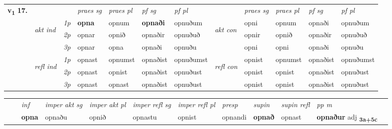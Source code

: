 \begin{tabular}{llllllllllll} \toprule
\multirow{4}{*}{{{\textbf{v{\textsubscript{1}}} \Large{\textbf{17.}}}}}  & &   &  \textit{praes sg}  & \textit{praes pl}  &\textit{ pf sg} & \textit{pf pl} &  &  \textit{praes sg}  & \textit{praes pl}  & \textit{pf sg} & \textit{pf pl } \\*
	\cmidrule{4-7} \cmidrule{9-12}
 & \multirow{3}{*}{\begin{turn}{90}\textit{akt ind}\end{turn}} & {\textit{1p}} & \textbf{opna} & opnum    & \textbf{opnaði} & opnuðum & \multirow{3}{*}{\begin{turn}{90}\textit{akt con}\end{turn}} &opni & opnum & opnaði & opnuðum\\*
& &  {\textit{2p}} &  opnar  & opnið   & opnaðir & opnuðuð & & opnir & opnið & opnaðir & opnuðuð \\*
& &  {\textit{3p}} & opnar & opna   & opnaði & opnuðu & & opni & opni& opnaði & opnuðu  \\*
\cmidrule{4-7} \cmidrule{9-12}
 &\multirow{3}{*}{\begin{turn}{90}\textit{refl ind}\end{turn}} & {\textit{1p}} & opnast & opnumst    & opnaðist & opnuðumst & \multirow{3}{*}{\begin{turn}{90}\textit{refl con}\end{turn}}  &opnist & opnumst & opnaðist & opnuðumst\\*
 &&  {\textit{2p}} &  opnast  & opnist   & opnaðist & opnuðust & &opnist & opnist & opnaðist & opnuðust \\*
& &  {\textit{3p}} & opnast & opnast   & opnaðist & opnuðust & & opnist & opnist& opnaðist & opnuðust  \\*
\cmidrule{4-7} \cmidrule{9-12}
\end{tabular}


\begin{tabular}{llllllllllll}
 & & \textit{inf} & \textit{imper akt sg} & \textit{imper akt pl} & \textit{imper refl sg} & \textit{imper refl pl} & \textit{presp} & \textit{supin} & \textit{supin refl} & \textit{pp m}     \\*
  & & \textbf{opna} & opnaðu  & opnið & opnastu & opnist & opnandi &  \textbf{opnað} & opnast & \textbf{opnaður} adj \textbf{\textsubscript{3a+5c}} \\*
\cmidrule{1-12}
\end{tabular}



